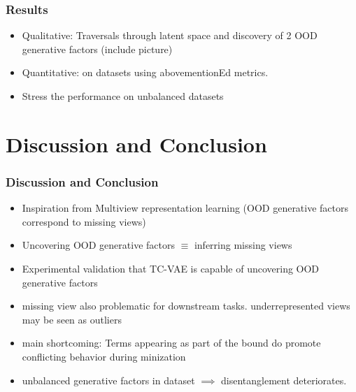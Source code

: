 \documentclass{beamer}
\theoremstyle{definition}
\begin{document}
    \begin{frame}
      \frametitle{Results}
      \begin{itemize}
        \item Qualitative: Traversals through latent space and discovery of 2 OOD generative factors (include picture)
        \item Quantitative: on datasets using abovementionEd metrics.
        \item Stress the performance on unbalanced datasets
      \end{itemize}
    \end{frame}

  \section{Discussion and Conclusion}
    \begin{frame}
      \frametitle{Discussion and Conclusion}
      \begin{itemize}
        \item Inspiration from Multiview representation learning (OOD generative factors correspond to missing views)
        \item Uncovering OOD generative factors $\equiv$ inferring missing views
        \item Experimental validation that TC-VAE is capable of uncovering OOD generative factors
        \item missing view also problematic for downstream tasks. underrepresented views may be seen as outliers
        \item main shortcoming: Terms appearing as part of the bound do promote conflicting behavior during minization
        \item unbalanced generative factors in dataset $\implies$ disentanglement deteriorates.
      \end{itemize}
    \end{frame}
\end{document}
